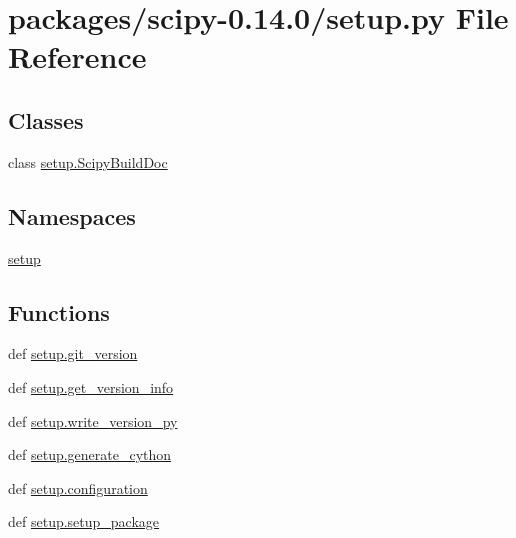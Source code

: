 \hypertarget{packages_2scipy-0_814_80_2setup_8py}{}\section{packages/scipy-\/0.14.0/setup.py File Reference}
\label{packages_2scipy-0_814_80_2setup_8py}
\subsection*{Classes}
\begin{DoxyCompactItemize}
\item 
class \hyperlink{classsetup_1_1ScipyBuildDoc}{setup.\+Scipy\+Build\+Doc}
\end{DoxyCompactItemize}
\subsection*{Namespaces}
\begin{DoxyCompactItemize}
\item 
 \hyperlink{namespacesetup}{setup}
\end{DoxyCompactItemize}
\subsection*{Functions}
\begin{DoxyCompactItemize}
\item 
def \hyperlink{namespacesetup_ad04c6c59cbb1504a37c209970541bdc7}{setup.\+git\+\_\+version}
\item 
def \hyperlink{namespacesetup_a41b98db87ac77e2fe441d097417cd29b}{setup.\+get\+\_\+version\+\_\+info}
\item 
def \hyperlink{namespacesetup_a4b228c686ec3d7599c6760a68085d216}{setup.\+write\+\_\+version\+\_\+py}
\item 
def \hyperlink{namespacesetup_a0a5437cdce14dc99354919a33c4f5b5f}{setup.\+generate\+\_\+cython}
\item 
def \hyperlink{namespacesetup_aadba901476be4570baf1f2199416672c}{setup.\+configuration}
\item 
def \hyperlink{namespacesetup_a108daf2a6d3e50a71d2b811564d90f0b}{setup.\+setup\+\_\+package}
\end{DoxyCompactItemize}
